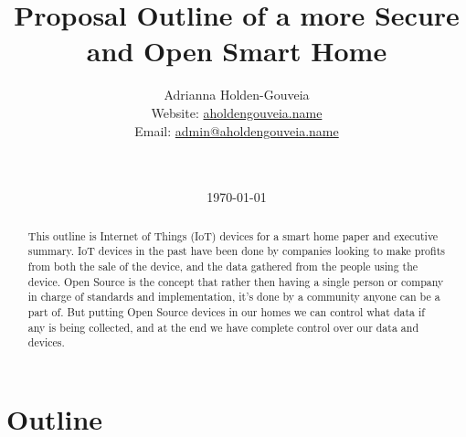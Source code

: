 \documentclass[12pt]{article}
\title{Proposal Outline of a more Secure and Open Smart Home}
\author{
        Adrianna Holden-Gouveia \\
        Website: \href{https://aholdengouveia.name}{aholdengouveia.name}\\ 
        Email: \href{mailto:admin@aholdengouveia.name}{admin@aholdengouveia.name} \\
        \faGithub {: aholdengouveia} \\
        \faTwitter {: aholdengouveia} \\
        }
\date{\today}
\begin{document}
    

\maketitle

\begin{abstract}
This outline is Internet of Things (IoT) devices for a smart home paper and executive summary. IoT devices in the past have been done by companies looking to make profits from both the sale of the device, and the data gathered from the people using the device.  Open Source is the concept that rather then having a single person or company in charge of standards and implementation, it's done by a community anyone can be a part of.  But putting Open Source devices in our homes we can control what data if any is being collected, and at the end we have complete control over our data and devices.
\end{abstract}


\section*{Outline}
\end{document}
